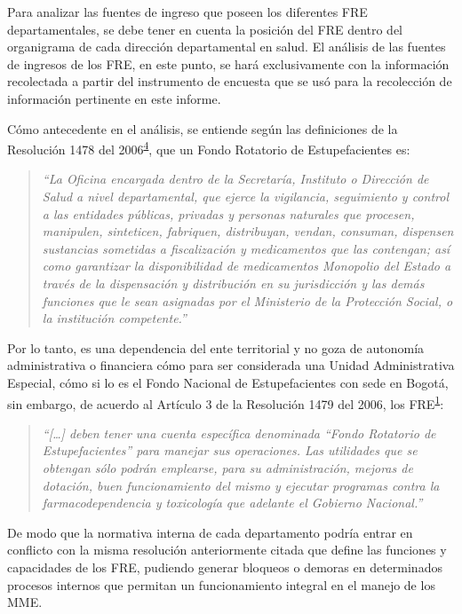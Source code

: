 \documentclass[
]{book}
\begin{document}
Para analizar las fuentes de ingreso que poseen los diferentes FRE departamentales, se debe tener en cuenta la posición del FRE dentro del organigrama de cada dirección departamental en salud. El análisis de las fuentes de ingresos de los FRE, en este punto, se hará exclusivamente con la información recolectada a partir del instrumento de encuesta que se usó para la recolección de información pertinente en este informe.

Cómo antecedente en el análisis, se entiende según las definiciones de la Resolución 1478 del 2006\textsuperscript{\protect\hyperlink{ref-MSPS1478-2006}{4}}, que un Fondo Rotatorio de Estupefacientes es:

\begin{quote}
\emph{``La Oficina encargada dentro de la Secretaría, Instituto o Dirección de Salud a nivel departamental, que ejerce la vigilancia, seguimiento y control a las entidades públicas, privadas y personas naturales que procesen, manipulen, sinteticen, fabriquen, distribuyan, vendan, consuman, dispensen sustancias sometidas a fiscalización y medicamentos que las contengan; así como garantizar la disponibilidad de medicamentos Monopolio del Estado a través de la dispensación y distribución en su jurisdicción y las demás funciones que le sean asignadas por el Ministerio de la Protección Social, o la institución competente.''}
\end{quote}

Por lo tanto, es una dependencia del ente territorial y no goza de autonomía administrativa o financiera cómo para ser considerada una Unidad Administrativa Especial, cómo si lo es el Fondo Nacional de Estupefacientes con sede en Bogotá, sin embargo, de acuerdo al Artículo 3 de la Resolución 1479 del 2006, los FRE\textsuperscript{\protect\hyperlink{ref-MSPS1479-2006}{1}}:

\begin{quote}
\emph{``{[}\ldots{]} deben tener una cuenta específica denominada ``Fondo Rotatorio de Estupefacientes'' para manejar sus operaciones. Las utilidades que se obtengan sólo podrán emplearse, para su administración, mejoras de dotación, buen funcionamiento del mismo y ejecutar programas contra la farmacodependencia y toxicología que adelante el Gobierno Nacional.''}
\end{quote}

De modo que la normativa interna de cada departamento podría entrar en conflicto con la misma resolución anteriormente citada que define las funciones y capacidades de los FRE, pudiendo generar bloqueos o demoras en determinados procesos internos que permitan un funcionamiento integral en el manejo de los MME.
\end{document}
